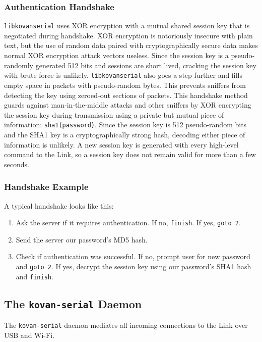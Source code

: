\documentclass[12pt,letterpaper]{article}
\begin{document}
	\subsubsection{Authentication Handshake}
	\texttt{libkovanserial} uses XOR encryption with a mutual shared session key that is negotiated during handshake. XOR encryption is notoriously insecure with plain text, 
	but the use of random data paired with cryptographically secure data makes normal XOR encryption attack vectors useless. Since the session key is a pseudo-randomly generated
	512 bits and sessions are short lived, cracking the session key with brute force is unlikely. \texttt{libkovanserial} also goes a step further and fills empty space in
	packets with pseudo-random bytes. This prevents sniffers from detecting the key using zeroed-out sections of packets. This handshake method guards against
	man-in-the-middle attacks and other sniffers by XOR encrypting the session key during transmission using a private but mutual piece of information:
	\texttt{sha1(password)}. Since the session key is 512 pseudo-random bits and the SHA1 key is a cryptographically strong hash, decoding either piece
	of information is unlikely. A new session key is generated with every high-level command to the Link, so a
	session key does not remain valid for more than a few seconds.
	
	\subsubsection{Handshake Example}
	
	A typical handshake looks like this:
	\begin{enumerate}
		\setlength{\itemsep}{0em}
		\item Ask the server if it requires authentication. If no, \texttt{finish}. If yes, \texttt{goto 2}.
		\item Send the server our password's MD5 hash.
		\item Check if authentication was successful. If no, prompt user for new password and \texttt{goto 2}.
		If yes, decrypt the session key using our password's SHA1 hash and \texttt{finish}.
	\end{enumerate}
	
	
	\subsection{The \texttt{kovan-serial} Daemon}
	The \texttt{kovan-serial} daemon mediates all incoming connections to the Link over USB and Wi-Fi.
	
\end{document}
